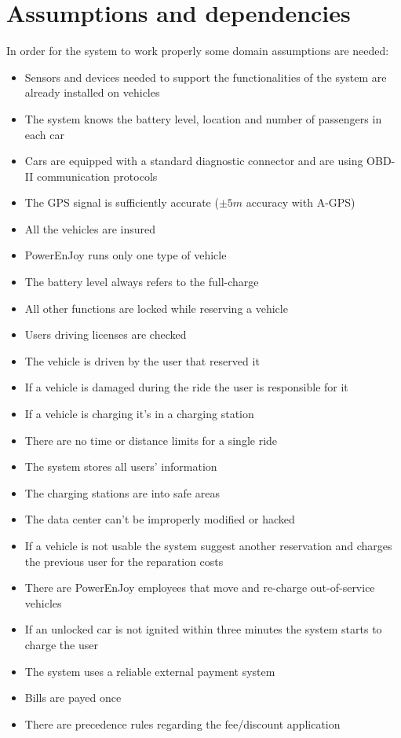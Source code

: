 \section{Assumptions and dependencies}
In order for the system to work properly some domain assumptions are needed:%
\begin{itemize}
	\item{Sensors and devices needed to support the functionalities of the system are already installed on vehicles}
	\item{The system knows the battery level, location and number of passengers in each car}
	\item{Cars are equipped with a standard diagnostic connector and are using OBD-II communication protocols}
	\item{The GPS signal is sufficiently accurate ($\pm5m$ accuracy with A-GPS)}
	\item{All the vehicles are insured}
	\item{PowerEnJoy runs only one type of vehicle}
	\item{The battery level always refers to the full-charge}

	\item{All other functions are locked while reserving a vehicle}
	\item{Users driving licenses are checked}
	\item{The vehicle is driven by the user that reserved it}
	\item{If a vehicle is damaged during the ride the user is responsible for it}
	\item{If a vehicle is charging it's in a charging station}	
	
	\item{There are no time or distance limits for a single ride}
	\item{The system stores all users' information}
	\item{The charging stations are into safe areas}
	\item{The data center can't be improperly modified or hacked}
	\item{If a vehicle is not usable the system suggest another reservation and charges the previous user for the reparation costs}
	\item{There are PowerEnJoy employees that move and re-charge out-of-service vehicles}

	\item{If an unlocked car is not ignited within three minutes the system starts to charge the user}
	\item{The system uses a reliable external payment system}
	\item{Bills are payed once}
	\item{There are precedence rules regarding the fee/discount application}	
	
\end{itemize}
